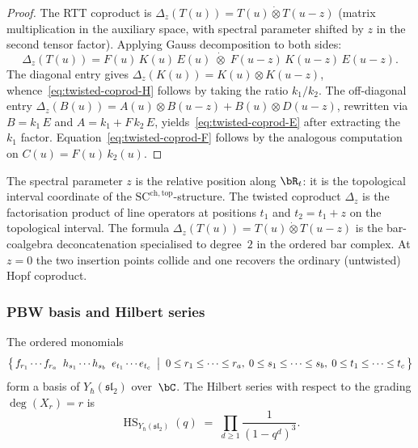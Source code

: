 \begin{proof}
The RTT coproduct is $\Delta_z(T(u)) = T(u) \dot\otimes T(u{-}z)$
(matrix multiplication in the auxiliary space, with spectral parameter
shifted by $z$ in the second tensor factor). Applying Gauss
decomposition to both sides:
\[
\Delta_z(T(u))
= F(u)\,K(u)\,E(u) \;\dot\otimes\; F(u{-}z)\,K(u{-}z)\,E(u{-}z).
\]
The diagonal entry gives
$\Delta_z(K(u)) = K(u) \otimes K(u{-}z)$,
whence~\eqref{eq:twisted-coprod-H} follows by taking the ratio
$k_1/k_2$. The off-diagonal entry
$\Delta_z(B(u)) = A(u) \otimes B(u{-}z) + B(u) \otimes D(u{-}z)$,
rewritten via $B = k_1\,E$ and $A = k_1 + F\,k_2\,E$,
yields~\eqref{eq:twisted-coprod-E} after extracting the $k_1$
factor. Equation~\eqref{eq:twisted-coprod-F} follows by the analogous
computation on $C(u) = F(u)\,k_2(u)$.
\end{proof}

\begin{remark}
\label{rem:twisted-coproduct-origin}
The spectral parameter $z$ is the relative position along $\bR_t$:
it is the topological interval coordinate of the
$\mathrm{SC}^{\mathrm{ch,top}}$-structure. The twisted coproduct
$\Delta_z$ is the factorisation product of line operators at positions
$t_1$ and $t_2 = t_1 + z$ on the topological interval. The formula
$\Delta_z(T(u)) = T(u) \dot\otimes T(u{-}z)$ is the bar-coalgebra
deconcatenation specialised to degree~$2$ in the ordered bar
complex. At $z = 0$ the two insertion points collide and one recovers
the ordinary (untwisted) Hopf coproduct.
\end{remark}

\subsubsection*{PBW basis and Hilbert series}

\begin{theorem}
\ClaimStatusProvedHere
\label{thm:PBW-yangian-sl2}
The ordered monomials
\[
\bigl\{\,
f_{r_1}\cdots f_{r_a}\;\;
h_{s_1}\cdots h_{s_b}\;\;
e_{t_1}\cdots e_{t_c}
\;\bigm|\;
0 \le r_1 \le \cdots \le r_a,\;
0 \le s_1 \le \cdots \le s_b,\;
0 \le t_1 \le \cdots \le t_c
\,\bigr\}
\]
form a basis of $Y_\hbar(\mathfrak{sl}_2)$ over~$\bC$. The Hilbert series
with respect to the grading $\deg(X_r) = r$ is
\[
\operatorname{HS}_{Y_\hbar(\mathfrak{sl}_2)}(q)
\;=\; \prod_{d \ge 1} \frac{1}{(1-q^d)^3}.
\]
\end{theorem}

